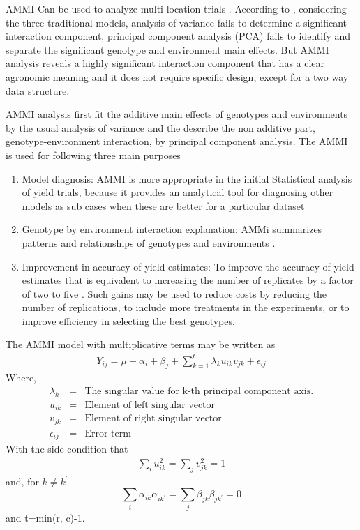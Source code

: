 AMMI Can be used to analyze multi-location trials \citep{Crossa1990}. According to \citet{Zobel1988}, considering the three traditional models, analysis of variance fails to determine a significant interaction component, principal component analysis (PCA) fails to identify and separate the significant genotype and environment main effects. But AMMI analysis reveals a highly significant interaction component that has a clear agronomic meaning and it does not require specific design, except for a two way data structure.

 AMMI analysis first fit the additive main effects of genotypes and environments by the usual analysis of variance and the describe the non additive part, genotype-environment interaction, by principal component analysis. The AMMI is used for following three main purposes
 \begin{enumerate}
 	\item Model diagnosis:  AMMI is more appropriate in the initial Statistical analysis of yield trials, because it provides an analytical tool for diagnosing other models as sub cases when these are better for a particular dataset \citep{Gauch1988}  
 	\item Genotype by environment interaction explanation: AMMi summarizes patterns and relationships of genotypes and environments  \citep{Crossa1990}.
 	\item Improvement in accuracy of yield estimates: To improve the accuracy of yield estimates that is equivalent to increasing the number of replicates by a factor of two to five \citep{Zobel1988}. Such gains may be used to reduce costs by reducing the number of replications, to include more treatments in the experiments, or to improve efficiency in selecting the best genotypes.
\end{enumerate}	 

The AMMI model with multiplicative terms may be written as
\begin{eqnarray}
Y_{ij}=\mu+\alpha_i +\beta_j+\sum_{k=1}^t \lambda_k u_{ik}v_{jk}+\epsilon_{ij} 
\end{eqnarray}
Where,
\begin{eqnarray}
\lambda_k &=& \text{The singular value for k-th principal component axis}.\nonumber \\
u_{ik} &=& \text{Element of left singular vector} \nonumber \\
v_{jk} &=& \text{Element of right singular vector} \nonumber \\
\epsilon_{ij} &=& \text{Error term} \nonumber
\end{eqnarray}
With the side condition that 
\begin{eqnarray}
\sum_iu_{ik}^2=\sum_jv_{jk}^2=1 \nonumber
\end{eqnarray}
 and, for $k\neq k^\prime$ 
 \begin{equation*} 
 \sum_i\alpha_{ik}\alpha_{ik^\prime}=\sum_j\beta_{jk}\beta_{jk^\prime}=0 \nonumber
 \end{equation*} 
 and t=min(r, c)-1.
 
